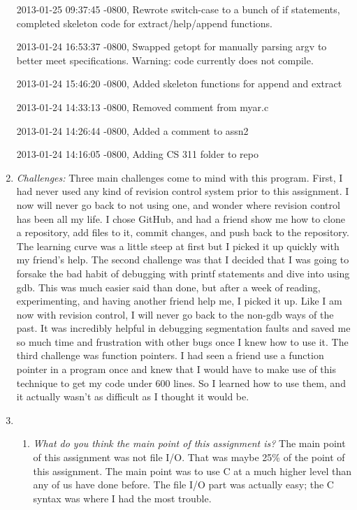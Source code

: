 \documentclass[letterpaper,10pt,titlepage]{article}
\begin{document}
\begin{enumerate}
2013-01-25 09:37:45 -0800, Rewrote switch-case to a bunch of if statements, completed skeleton code for extract/help/append functions.

2013-01-24 16:53:37 -0800, Swapped getopt for manually parsing argv to better meet specifications. Warning: code currently does not compile.

2013-01-24 15:46:20 -0800, Added skeleton functions for append and extract

2013-01-24 14:33:13 -0800, Removed comment from myar.c

2013-01-24 14:26:44 -0800, Added a comment to assn2

2013-01-24 14:16:05 -0800, Adding CS 311 folder to repo

\item \emph{Challenges:}
Three main challenges come to mind with this program. First, I had never used any kind of revision control system prior to this assignment. I now will never go back to not using one, and wonder where revision control has been all my life. I chose GitHub, and had a friend show me how to clone a repository, add files to it, commit changes, and push back to the repository. The learning curve was a little steep at first but I picked it up quickly with my friend’s help. The second challenge was that I decided that I was going to forsake the bad habit of debugging with printf statements and dive into using gdb. This was much easier said than done, but after a week of reading, experimenting, and having another friend help me, I picked it up. Like I am now with revision control, I will never go back to the non-gdb ways of the past. It was incredibly helpful in debugging segmentation faults and saved me so much time and frustration with other bugs once I knew how to use it. The third challenge was function pointers. I had seen a friend use a function pointer in a program once and knew that I would have to make use of this technique to get my code under 600 lines. So I learned how to use them, and it actually wasn’t as difficult as I thought it would be.

\item \begin{enumerate}
	\item \emph{What do you think the main point of this assignment is?} The main point of this assignment was not file I/O. That was maybe 25\% of the point of this assignment. The main point was to use C at a much higher level than any of us have done before. The file I/O part was actually easy; the C syntax was where I had the most trouble.


\end{enumerate}
\end{enumerate}
\end{document}
